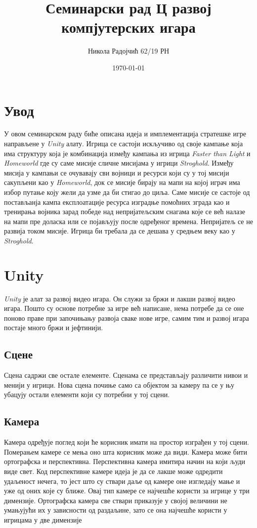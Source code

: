 \documentclass[11pt,a4paper]{article}
\title{Семинарски рад Ц развој компјутерских игара}
\author{Никола Радојчић 62/19 РН}
\date{\today}
\begin{document}
\maketitle
\newpage

\tableofcontents
\newpage

\section{Увод}
У овом семинарском раду биће описана идеја и имплементација стратешке игре направљене у \emph{Unity} алату. Игрица се састоји искључиво од своје кампање која има структуру која је комбинација између кампања из игрица \emph{Faster than Light} и \emph{Homeworld} где су саме мисије сличне мисијама у игрици \emph{Stroghold}. Између мисија у кампањи се очувавају сви војници и ресурси који су у тој мисији сакупљени као у \emph{Homeworld}, док се мисије бирају на мапи на којој играч има избор путање коју жели да узме да би стигао до циља. Саме мисије се састоје од постављанја кампа експлоатације ресурса изградње помоћних зграда као и тренирања војника зарад победе над непријатељским снагама које се већ налазе на мапи пре доласка или се појављују после одређеног времена. Непријатељ се не развија током мисије. Игрица би требала да се дешава у средњем веку као у \emph{Stroghold}.
\newpage

\section{Unity}
\emph{Unity} је алат за развој видео игара. Он служи за бржи и лакши развој видео игара. Пошто су основе потребне за игре већ написане, нема потребе да се оне поново праве при започињању развоја сваке нове игре, самим тим и развој игара постаје много бржи и јефтинији. 
\subsection{Сцене}
Сцена садржи све остале елементе. Сценама се представљају различити  нивои и менији у игрици. Нова сцена почиње само са објектом за камеру па се у њу убацују остали елементи који су потребни у тој сцени.
\subsection{Камера}
Камера одређује поглед који ће корисник имати на простор изграђен у тој сцени. Померањем камере се мења оно шта корисник може да види. Камера може бити ортографска и перспективна. Перспективна камера имитира начин на који људи виде свет. Код перспективне камере идеја је да се лакше може одредити удаљеност нечега, то јест што су ствари даље од камере оне изгледају мање и уже од оних које су ближе. Овај тип камере се најчешће користи за игрице у три димензије. Ортографска камера све ствари приказује у својој величини не умањујући их у зависности од раздаљине, зато се она најчешће користи у игрицама у две димензије
\end{document}
